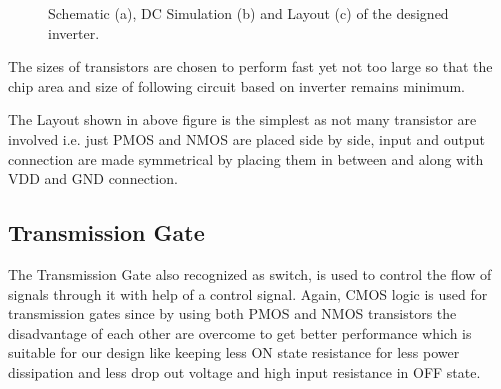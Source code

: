 \documentclass[parskip,oneside,colorbacktitle,10pt,accentcolor=tud1b,table]{tudreport}
\begin{document}
{\begin{figure}[H]
\begin{center}
{        }
       \caption{Schematic (a), DC Simulation (b) and Layout (c) of the designed inverter.}
       \label{fig:inverter}
    \end{center}
\end{figure}

The sizes of transistors are chosen to perform fast yet not too large so that the chip area and size of following circuit based on inverter remains minimum.

The Layout shown in above figure is the simplest as not many transistor are involved i.e. just PMOS and NMOS are placed side by side, input and output connection are made symmetrical by placing them in between and along with VDD and GND connection.

\subsection{Transmission Gate}


\begin{minipage}[t]{0.40\textwidth}
	\setlength{\parskip}{\currentparskip} %
The Transmission Gate also recognized as switch, is used to control the flow of signals through it with help of a control signal. Again, CMOS logic is used for transmission gates since by using both PMOS and NMOS transistors the disadvantage of each other are overcome to get better performance which is suitable for our design like keeping less ON state resistance for less power dissipation and less drop out voltage and high input resistance in OFF state. 


\end{minipage}}
\end{document}
